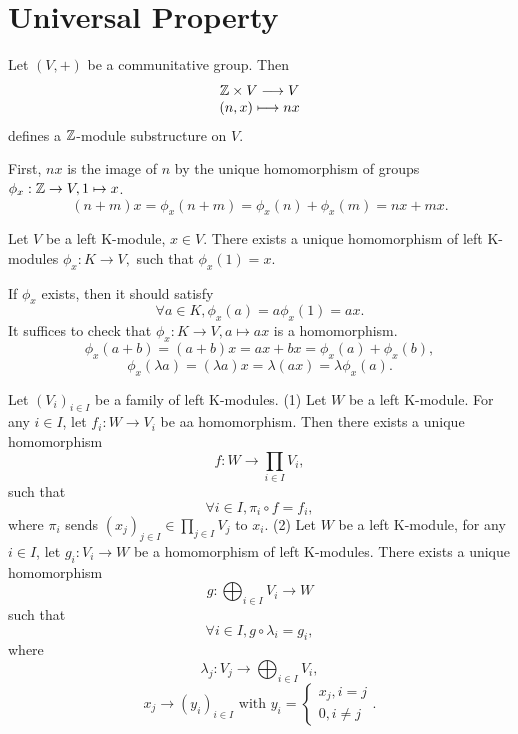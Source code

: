 \documentclass{book}
\numberwithin{equation}{section}
\begin{document}
\section{Universal Property}
\begin{propositionenv}
    Let $(V,+)$ be a communitative group. Then 
    $$\begin{matrix}
        \mathbb{Z}\times V\longrightarrow V\\
        (n,x)\longmapsto nx
    \end{matrix}$$
    defines a $\mathbb{Z}$-module substructure on $V$.
\end{propositionenv}
\begin{proofenv}
    First, $nx$ is the image of $n$ by the unique homomorphism of groups $\phi_x:\mathbb{Z}\rightarrow V,1\mapsto x$.
    $$(n+m)x=\phi_x(n+m)=\phi_x(n)+\phi_x(m)=nx+mx.$$
\end{proofenv}
\begin{propositionenv}
    Let $V$ be a left K-module, $x\in V$. There exists a unique homomorphism of left K-modules 
    $\phi_x:K\longrightarrow V,$
    such that $\phi_x(1)=x$.
\end{propositionenv}
\begin{proofenv}
    If $\phi_x$ exists, then it should satisfy 
    $$\forall a\in K,\phi_x(a)=a\phi_x(1)=ax.$$
    It suffices to check that $\phi_x:K\rightarrow V,a\mapsto ax$ is a homomorphism.
    $$\phi_x(a+b)=(a+b)x=ax+bx=\phi_x(a)+\phi_x(b),$$
    $$\phi_x(\lambda a)=(\lambda a)x=\lambda(ax)=\lambda\phi_x(a).$$
\end{proofenv}
\begin{propositionenv}
    Let $(V_i)_{i\in I}$ be a family of left K-modules.
    \newline
    (1) Let $W$ be a left K-module. For any $i\in I$, let $f_i:W\rightarrow V_i$ be aa homomorphism. Then there exists a unique homomorphism 
    $$f:W\longrightarrow \prod_{i\in I}V_i,$$ 
    such that 
    $$\forall i\in I,\pi_i\circ f=f_i,$$
    where $\pi_i$ sends $(x_j)_{j\in I}\in \prod_{j\in I}V_j$ to $x_i$.
    \newline
    (2) Let $W$ be a left K-module, for any $i\in I$, let $g_i:V_i\rightarrow W$ be a homomorphism of left K-modules. There exists a unique homomorphism
    $$g:\bigoplus_{i\in I}V_i\longrightarrow W$$
    such that 
    $$\forall i\in I, g\circ\lambda_i=g_i,$$
    where
    $$\lambda_j:V_j\longrightarrow\bigoplus_{i\in I}V_i,$$
    $$x_j\longrightarrow (y_i)_{i\in I} \text{ with } y_i=\left\{\begin{matrix}
        x_j,i=j\\0,i\not=j
    \end{matrix}\right. .$$
\end{propositionenv}
\end{document}
